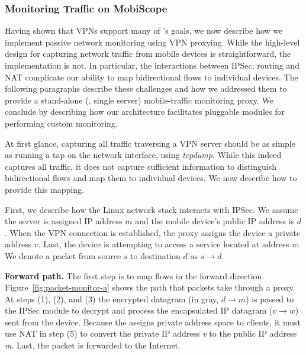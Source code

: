 \subsubsection{Monitoring Traffic on MobiScope}
\label{sec:monit-traff-mobiscope}



Having shown that VPNs support many of \platname{}'s goals, 
we now describe how we implement passive network monitoring 
using VPN proxying. While the high-level design for capturing 
network traffic from mobile devices is straightforward, the implementation 
is not. In particular, the interactions between IPSec, routing and NAT 
complicate our ability to map bidirectional flows to individual devices. 
The following paragraphs describe these challenges and how we 
addressed them to provide a stand-alone (\ie, single server) mobile-traffic monitoring 
proxy. We conclude by describing how our architecture facilitates 
pluggable modules for performing custom monitoring.

At first glance, capturing all traffic traversing a VPN server should be 
as simple as running a tap on the network interface, \eg using \textit{tcpdump}. 
While this indeed captures all traffic, it does not capture sufficient information 
to distinguish bidirectional flows and map them to individual devices. We now 
describe how to provide this mapping.

First, we describe how the Linux network stack interacts with IPSec. 
We assume the \platname{} server is assigned 
IP address $m$ and the mobile device's public IP address is $d$. When 
the VPN connection is established, the proxy assigns the device a private address 
$v$. Last, the device is attempting to access a service located at address $w$. 
We denote a packet from source $s$ to destination $d$ as $s \rightarrow d$.

\noindent \textbf{Forward path.} The first step is to map flows in the forward direction. Figure~\ref{fig:packet-monitor-a} shows the path that packets take 
through a \platname{} proxy.  At steps (1),
(2), and (3) the encrypted datagram (in gray, $d \rightarrow m$) is passed to the IPSec 
module to decrypt and process the encapsulated IP datagram ($v \rightarrow w$) sent from 
the device. Because the \platname{} assigns private address space to 
clients, it must use NAT in step (5) to convert the private IP address \emph{v} to the public IP
address \emph{m}. Last, the packet is forwarded to the Internet. 

